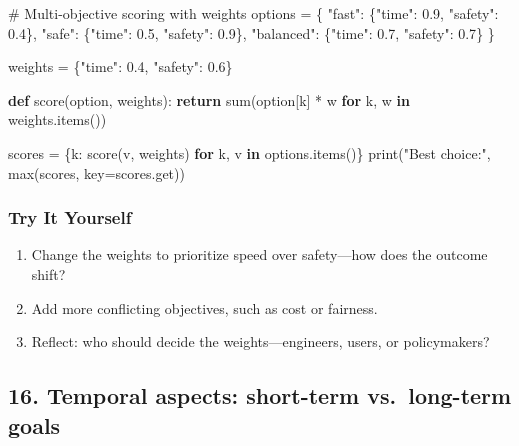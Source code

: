 \documentclass[
  letterpaper,
  DIV=11,
  numbers=noendperiod]{scrreprt}
\newenvironment{Shaded}{\begin{snugshade}}{\end{snugshade}}
\newcommand{\BuiltInTok}[1]{\textcolor[rgb]{0.00,0.23,0.31}{#1}}
\newcommand{\CommentTok}[1]{\textcolor[rgb]{0.37,0.37,0.37}{#1}}
\newcommand{\ControlFlowTok}[1]{\textcolor[rgb]{0.00,0.23,0.31}{\textbf{#1}}}
\newcommand{\FloatTok}[1]{\textcolor[rgb]{0.68,0.00,0.00}{#1}}
\newcommand{\KeywordTok}[1]{\textcolor[rgb]{0.00,0.23,0.31}{\textbf{#1}}}
\newcommand{\NormalTok}[1]{\textcolor[rgb]{0.00,0.23,0.31}{#1}}
\newcommand{\OperatorTok}[1]{\textcolor[rgb]{0.37,0.37,0.37}{#1}}
\newcommand{\StringTok}[1]{\textcolor[rgb]{0.13,0.47,0.30}{#1}}
\providecommand{\tightlist}{%
  \setlength{\itemsep}{0pt}\setlength{\parskip}{0pt}}
\begin{document}
\begin{Shaded}
\begin{Highlighting}[]
\CommentTok{\# Multi{-}objective scoring with weights}
\NormalTok{options }\OperatorTok{=}\NormalTok{ \{}
    \StringTok{"fast"}\NormalTok{: \{}\StringTok{"time"}\NormalTok{: }\FloatTok{0.9}\NormalTok{, }\StringTok{"safety"}\NormalTok{: }\FloatTok{0.4}\NormalTok{\},}
    \StringTok{"safe"}\NormalTok{: \{}\StringTok{"time"}\NormalTok{: }\FloatTok{0.5}\NormalTok{, }\StringTok{"safety"}\NormalTok{: }\FloatTok{0.9}\NormalTok{\},}
    \StringTok{"balanced"}\NormalTok{: \{}\StringTok{"time"}\NormalTok{: }\FloatTok{0.7}\NormalTok{, }\StringTok{"safety"}\NormalTok{: }\FloatTok{0.7}\NormalTok{\}}
\NormalTok{\}}

\NormalTok{weights }\OperatorTok{=}\NormalTok{ \{}\StringTok{"time"}\NormalTok{: }\FloatTok{0.4}\NormalTok{, }\StringTok{"safety"}\NormalTok{: }\FloatTok{0.6}\NormalTok{\}}

\KeywordTok{def}\NormalTok{ score(option, weights):}
    \ControlFlowTok{return} \BuiltInTok{sum}\NormalTok{(option[k] }\OperatorTok{*}\NormalTok{ w }\ControlFlowTok{for}\NormalTok{ k, w }\KeywordTok{in}\NormalTok{ weights.items())}

\NormalTok{scores }\OperatorTok{=}\NormalTok{ \{k: score(v, weights) }\ControlFlowTok{for}\NormalTok{ k, v }\KeywordTok{in}\NormalTok{ options.items()\}}
\BuiltInTok{print}\NormalTok{(}\StringTok{"Best choice:"}\NormalTok{, }\BuiltInTok{max}\NormalTok{(scores, key}\OperatorTok{=}\NormalTok{scores.get))}
\end{Highlighting}
\end{Shaded}

\subsubsection{Try It Yourself}\label{try-it-yourself-14}

\begin{enumerate}
\def\labelenumi{\arabic{enumi}.}
\tightlist
\item
  Change the weights to prioritize speed over safety---how does the
  outcome shift?
\item
  Add more conflicting objectives, such as cost or fairness.
\item
  Reflect: who should decide the weights---engineers, users, or
  policymakers?
\end{enumerate}

\subsection{16. Temporal aspects: short-term vs.~long-term
goals}\label{temporal-aspects-short-term-vs.-long-term-goals}
\end{document}
